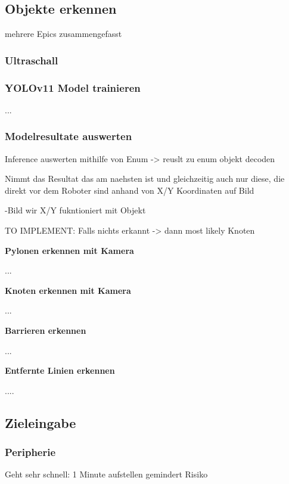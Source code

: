 
\subsection{Objekte erkennen}

mehrere Epics zusammengefasst 

\subsubsection{Ultraschall}

\subsubsection{YOLOv11 Model trainieren}

...

\subsubsection{Modelresultate auswerten}
\label{model-results}

Inference auswerten mithilfe von Enum -> reuslt zu enum objekt decoden

Nimmt das Resultat das am naehsten ist und gleichzeitig auch nur diese, die direkt vor dem Roboter sind anhand von X/Y Koordinaten auf Bild

-Bild wir X/Y fukntioniert mit Objekt

TO IMPLEMENT: Falls nichts erkannt -> dann most likely Knoten

\textbf{Pylonen erkennen mit Kamera}

...

\textbf{Knoten erkennen mit Kamera}

...

\textbf{Barrieren erkennen}

...

\textbf{Entfernte Linien erkennen}

....

\newpage
\subsection{Zieleingabe}

\subsubsection{Peripherie}
\label{zieleingabe}

Geht sehr schnell: 1 Minute aufstellen gemindert Risiko